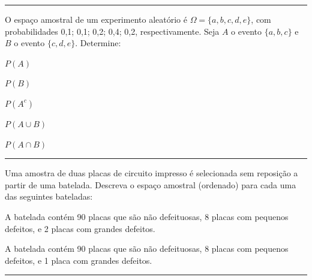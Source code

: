 \documentclass[a4paper,11pt,fleqn]{article}\usepackage[]{graphicx}\usepackage[]{color}
\theoremstyle{definition}
\begin{document}
\begin{compactenum}
\vspace{0.3cm}
\hrule
\vspace{0.3cm}

\item O espaço amostral de um experimento aleatório é $\Omega = \{a, b, c, d,
  e\}$, com probabilidades 0,1; 0,1; 0,2; 0,4; 0,2, respectivamente.
  Seja $A$ o evento $\{a, b, c\}$ e $B$ o evento $\{c, d, e\}$.
  Determine: \\
  \begin{inparaenum}
  \item $P(A)$ \,
  \item $P(B)$ \,
  \item $P(A^c)$ \,
  \item $P(A \cup B)$ \,
  \item $P(A \cap B)$
  \end{inparaenum}

\vspace{0.3cm}
\hrule
\vspace{0.3cm}


\item Uma amostra de duas placas de circuito impresso é selecionada sem
  reposição a partir de uma batelada. Descreva o espaço amostral
  (ordenado) para cada uma das seguintes bateladas:
  \begin{compactenum}
  \item A batelada contém 90 placas que são não defeituosas, 8 placas
    com pequenos defeitos, e 2 placas com grandes defeitos.
  \item A batelada contém 90 placas que são não defeituosas, 8 placas
    com pequenos defeitos, e 1 placa com grandes defeitos.
  \end{compactenum}

\vspace{0.3cm}
\hrule
\vspace{0.3cm}


\end{compactenum}
\end{document}
